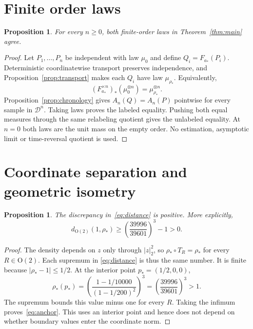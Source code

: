 \documentclass[11pt]{article}
\newtheorem{proposition}[theorem]{Proposition}
\theoremstyle{remark}
\newcommand{\D}{\mathcal D}
\newcommand{\Otwo}{\mathrm O(2)}
\begin{document}
\section{Finite order laws}\label{sec:laws}
\begin{proposition}\label{prop:laws}
For every $n\geq0$, both finite-order laws in Theorem~\ref{thm:main} agree.
\end{proposition}
\begin{proof}
Let $P_1,\ldots,P_n$ be independent with law $\mu_0$ and define
$Q_i=F_{a_*}(P_i)$. Deterministic coordinatewise transport preserves
independence, and Proposition~\ref{prop:transport} makes each $Q_i$
have law $\mu_{\rho_*}$. Equivalently,
\[
 (F_{a_*}^{\times n})_*(\mu_0^{\otimes n})
 =\mu_{\rho_*}^{\otimes n}.
\]
Proposition~\ref{prop:chronology} gives $A_n(Q)=A_n(P)$ pointwise for
every sample in $\D^n$. Taking laws proves the labeled equality.
Pushing both equal measures through the same relabeling quotient gives
the unlabeled equality. At $n=0$ both laws are the unit mass on the
empty order. No estimation, asymptotic limit or time-reversal quotient
is used.
\end{proof}

\section{Coordinate separation and geometric isometry}\label{sec:separation}
\begin{proposition}\label{prop:positive}
The discrepancy in~\eqref{eq:distance} is positive. More explicitly,
\begin{equation}\label{eq:anchor}
 d_{\Otwo}(1,\rho_*)\geq
 \left(\frac{39996}{39601}\right)^3-1>0.
\end{equation}
\end{proposition}
\begin{proof}
The density depends on $z$ only through $|z|_2^2$, so
$\rho_*\circ T_R=\rho_*$ for every $R\in\Otwo$. Each supremum in
\eqref{eq:distance} is thus the same number. It is finite because
$|\rho_*-1|\leq1/2$. At the interior point $p_*=(1/2,0,0)$,
\[
 \rho_*(p_*)=
 \left(\frac{1-1/10000}{(1-1/200)^2}\right)^3
 =\left(\frac{39996}{39601}\right)^3>1.
\]
The supremum bounds this value minus one for every $R$. Taking the
infimum proves~\eqref{eq:anchor}. This uses an interior point and hence
does not depend on whether boundary values enter the coordinate norm.
\end{proof}
\end{document}
